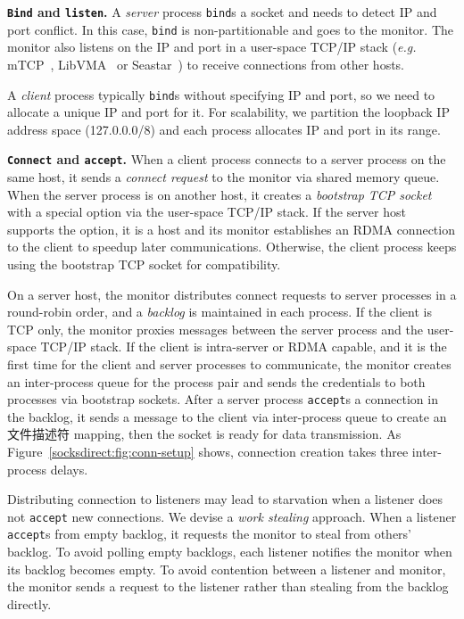 \iffalse

\textbf{\texttt{Bind} and \texttt{listen}.}
A \emph{server} process \texttt{bind}s a socket and needs to detect IP and port conflict. In this case, \texttt{bind} is non-partitionable and goes to the monitor. The monitor also listens on the IP and port in a user-space TCP/IP stack (\textit{e.g.} mTCP~\cite{jeong2014mtcp}, LibVMA~\cite{libvma} or Seastar~\cite{seastar}) to receive connections from other hosts.

A \emph{client} process typically \texttt{bind}s without specifying IP and port, so we need to allocate a unique IP and port for it. For scalability, we partition the loopback IP address space (127.0.0.0/8) and each process allocates IP and port in its range.

\textbf{\texttt{Connect} and \texttt{accept}.}
When a client process connects to a server process on the same host, it sends a \textit{connect request} to the monitor via shared memory queue. When the server process is on another host, it creates a \textit{bootstrap TCP socket} with a special option via the user-space TCP/IP stack. If the server host supports the option, it is a \sys host and its monitor establishes an RDMA connection to the client to speedup later communications. Otherwise, the client process keeps using the bootstrap TCP socket for compatibility.

On a server host, the monitor distributes connect requests to server processes in a round-robin order, and a \textit{backlog} is maintained in each process. If the client is TCP only, the monitor proxies messages between the server process and the user-space TCP/IP stack. If the client is intra-server or RDMA capable, and it is the first time for the client and server processes to communicate, the monitor creates an inter-process queue for the process pair and sends the credentials to both processes via bootstrap sockets. After a server process \texttt{accept}s a connection in the backlog, it sends a message to the client via inter-process queue to create an 文件描述符 mapping, then the socket is ready for data transmission. As Figure~\ref{socksdirect:fig:conn-setup} shows, connection creation takes three inter-process delays.

Distributing connection to listeners may lead to starvation when a listener does not \texttt{accept} new connections. We devise a \textit{work stealing} approach. When a listener \texttt{accept}s from empty backlog, it requests the monitor to steal from others' backlog. To avoid polling empty backlogs, each listener notifies the monitor when its backlog becomes empty. To avoid contention between a listener and monitor, the monitor sends a request to the listener rather than stealing from the backlog directly.


